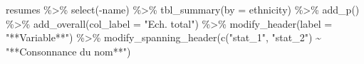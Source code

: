 \documentclass[
  11pt,
]{book}
\newenvironment{Shaded}{\begin{snugshade}}{\end{snugshade}}
\newcommand{\AttributeTok}[1]{\textcolor[rgb]{0.77,0.63,0.00}{#1}}
\newcommand{\FunctionTok}[1]{\textcolor[rgb]{0.00,0.00,0.00}{#1}}
\newcommand{\NormalTok}[1]{#1}
\newcommand{\SpecialCharTok}[1]{\textcolor[rgb]{0.00,0.00,0.00}{#1}}
\newcommand{\StringTok}[1]{\textcolor[rgb]{0.31,0.60,0.02}{#1}}
\numberwithin{equation}{section}
\numberwithin{countremarque}{section}
\begin{document}
\begin{Shaded}
\begin{Highlighting}[]
\NormalTok{resumes }\SpecialCharTok{\%\textgreater{}\%}
  \FunctionTok{select}\NormalTok{(}\SpecialCharTok{{-}}\NormalTok{name) }\SpecialCharTok{\%\textgreater{}\%} 
  \FunctionTok{tbl\_summary}\NormalTok{(}\AttributeTok{by =}\NormalTok{ ethnicity) }\SpecialCharTok{\%\textgreater{}\%} 
  \FunctionTok{add\_p}\NormalTok{() }\SpecialCharTok{\%\textgreater{}\%} 
  \FunctionTok{add\_overall}\NormalTok{(}\AttributeTok{col\_label =} \StringTok{"Ech. total"}\NormalTok{) }\SpecialCharTok{\%\textgreater{}\%} 
  \FunctionTok{modify\_header}\NormalTok{(}\AttributeTok{label =} \StringTok{"**Variable**"}\NormalTok{) }\SpecialCharTok{\%\textgreater{}\%} 
  \FunctionTok{modify\_spanning\_header}\NormalTok{(}\FunctionTok{c}\NormalTok{(}\StringTok{"stat\_1"}\NormalTok{, }\StringTok{"stat\_2"}\NormalTok{) }\SpecialCharTok{\textasciitilde{}} \StringTok{"**Consonnance du nom**"}\NormalTok{)}
\end{Highlighting}
\end{Shaded}
\end{document}
